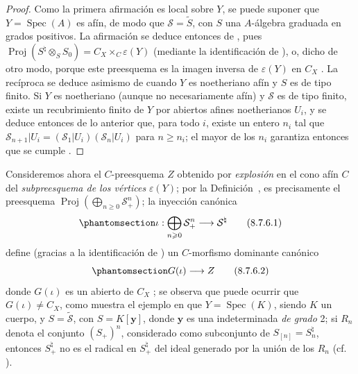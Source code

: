 \documentclass[oneside,10pt]{amsart}
\newcommand{\oldpage}[2][]{\marginnote{\normalfont\footnotesize\textbf{#1}~|~#2}\ignorespaces}
\let\EGAOriginalLabel\label
\renewcommand{\label}[1]{\phantomsection\EGAOriginalLabel{#1}}
\begin{document}
\begin{proof}
Como la primera afirmación es local sobre $Y$, se puede suponer que $Y=\operatorname{Spec}(A)$ es afín, de modo que $\mathcal{S}=\widetilde{S}$, con $S$ una $A$-álgebra graduada en grados positivos.
La afirmación se deduce entonces de , pues $\operatorname{Proj}(S^{\natural}\otimes_S S_0)=
C_X\times_C\varepsilon(Y)$ (mediante la identificación de ), o, dicho de otro modo, porque este preesquema es la imagen inversa de $\varepsilon(Y)$ en $C_X$ .
La recíproca se deduce asimismo de  cuando $Y$ es noetheriano afín y $S$ es de tipo finito.
\oldpage[II]{177}
Si $Y$ es noetheriano (aunque no necesariamente afín) y $\mathcal{S}$ es de tipo finito, existe un recubrimiento finito de $Y$ por abiertos afines noetherianos $U_i$, y se deduce entonces de lo anterior que, para todo $i$, existe un entero $n_i$ tal que $\mathcal{S}_{n+1}|U_i=(\mathcal{S}_1|U_i)(\mathcal{S}_n|U_i)$ para $n\geqslant n_i$;
el mayor de los $n_i$ garantiza entonces que se cumple .
\end{proof}
\begin{env}[8.7.6]
\label{II.8.7.6-fr}
Consideremos ahora el $C$-preesquema $Z$ obtenido por \emph{explosión} en el cono afín $C$ del \emph{subpreesquema de los vértices} $\varepsilon(Y)$;
por la Definición~, es precisamente el preesquema $\operatorname{Proj}(\bigoplus_{n\geqslant 0}\mathcal{S}_+^n)$;
la inyección canónica
\begin{equation}
\label{II.8.7.6.1-fr}
  \iota:\bigoplus_{n\geqslant 0}\mathcal{S}_+^n
  \longrightarrow\mathcal{S}^{\natural}
\tag{8.7.6.1}
\end{equation}
define (gracias a la identificación de ) un $C$-morfismo dominante canónico
\begin{equation}
\label{II.8.7.6.2-fr}
  G(\iota)\longrightarrow Z
\tag{8.7.6.2}
\end{equation}
donde $G(\iota)$ es un abierto de $C_X$ ;
se observa que puede ocurrir que $G(\iota)\ne C_X$, como muestra el ejemplo en que $Y=\operatorname{Spec}(K)$, siendo $K$ un cuerpo, y $S=\widetilde{\mathcal{S}}$, con $S=K[\mathbf{y}]$, donde $\mathbf{y}$ es una indeterminada \emph{de grado} 2;
si $R_n$ denota el conjunto $(S_+)^n$, considerado como subconjunto de $S_{[n]}=S_n^{\natural}$, entonces $S_+^{\natural}$ no es el radical en $S_+^{\natural}$ del ideal generado por la unión de los $R_n$ (cf. ).
\end{env}
\end{document}
